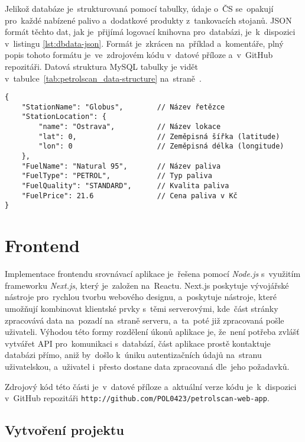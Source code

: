 Jelikož databáze je~strukturovaná pomocí tabulky, údaje o~ČS se~opakují
pro~každé nabízené palivo a~dodatkové produkty z~tankovacích stojanů.
JSON formát těchto dat, jak je~přijímá logovací knihovna pro~databázi,
je~k~dispozici v~listingu \ref{lst:dbdata-json}. Formát je~zkrácen na~příklad
a~komentáře, plný popis tohoto formátu je~ve~zdrojovém kódu v~datové příloze
a~v~GitHub repozitáři. Datová struktura MySQL tabulky je vidět
v~tabulce~\ref{tab:petrolscan_data-structure}
na~straně~\pageref{tab:petrolscan_data-structure}.
\bigskip

\begin{lstlisting}[caption={JSON formát dat pro logovací knihovnu},label=lst:dbdata-json]
{
    "StationName": "Globus",        // Název řetězce
    "StationLocation": {
        "name": "Ostrava",          // Název lokace
        "lat": 0,                   // Zeměpisná šířka (latitude)
        "lon": 0                    // Zeměpisná délka (longitude)
    },
    "FuelName": "Natural 95",       // Název paliva
    "FuelType": "PETROL",           // Typ paliva
    "FuelQuality": "STANDARD",      // Kvalita paliva
    "FuelPrice": 21.6               // Cena paliva v Kč
}
\end{lstlisting}

\section{Frontend}
\label{sec:development-frontend}

Implementace frontendu srovnávací aplikace je~řešena pomocí \emph{Node.js}
s~využitím frameworku \emph{Next.js}, který je~založen na~Reactu. Next.js
poskytuje vývojářské nástroje pro~rychlou tvorbu webového designu, a~poskytuje
nástroje, které umožňují kombinovat klientské prvky s~těmi serverovými,
kde~část stránky zpracovává data na~pozadí na~straně serveru, a~ta~poté již
zpracovaná pošle uživateli. Výhodou této formy rozdělení úkonů aplikace je,
že~není potřeba zvlášť vytvářet API pro~komunikaci s~databází, část aplikace
prostě kontaktuje databázi přímo, aniž by~došlo k~úniku autentizačních
údajů na~stranu uživatelskou, a~uživatel i~přesto dostane data zpracovaná
dle~jeho požadavků.

Zdrojový kód této části je~v~datové příloze a~aktuální verze kódu
je~k~dispozici v~GitHub repozitáři
\texttt{http://github.com/POL0423/petrolscan-web-app}.

\subsection{Vytvoření projektu}

